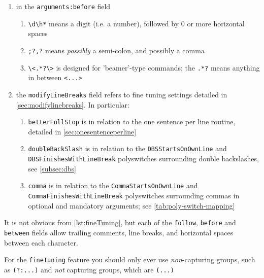 \documentclass[10pt]{article}
\begin{document}
\begin{enumerate}
\begin{enumerate}
         \item \lstinline^(?<!\\)\{)^ means a \lstinline^{^ but it can \emph{not} be immediately preceded by a \lstinline!\!
        \end{enumerate}
  \item in the \texttt{arguments:before} field
        \begin{enumerate}
         \item \lstinline^\d\h*^ means a digit (i.e. a number), followed by 0 or more horizontal spaces
         \item \lstinline^;?,?^ means \emph{possibly} a semi-colon, and possibly a comma
         \item \lstinline^\<.*?\>^ is designed for 'beamer'-type commands; the
               \lstinline^.*?^ means anything in between \lstinline^<...>^
        \end{enumerate}
  \item the \texttt{modifyLineBreaks} field refers to fine tuning settings detailed in
        \vref{sec:modifylinebreaks}. In particular:
        \begin{enumerate}
         \item \texttt{betterFullStop} is in relation to the one sentence per line routine, detailed in
               \vref{sec:onesentenceperline}
         \item \texttt{doubleBackSlash} is in relation to the \texttt{DBSStartsOnOwnLine} and
               \texttt{DBSFinishesWithLineBreak} polyswitches surrounding double backslashes, see
               \vref{subsec:dbs}
         \item \texttt{comma} is in relation to the \texttt{CommaStartsOnOwnLine} and
               \texttt{CommaFinishesWithLineBreak} polyswitches surrounding commas in optional and
               mandatory arguments; see \vref{tab:poly-switch-mapping}
        \end{enumerate}
 \end{enumerate}

 It is not obvious from \cref{lst:fineTuning}, but each of the \texttt{follow},
 \texttt{before} and \texttt{between} fields allow trailing comments, line breaks, and
 horizontal spaces between each character.

 \begin{warning}
  For the \texttt{fineTuning} feature you should only ever use \emph{non}-capturing
  groups, such as \lstinline!(?:...)! and \emph{not} capturing groups, which are
  \lstinline!(...)!
 \end{warning}
\end{document}
